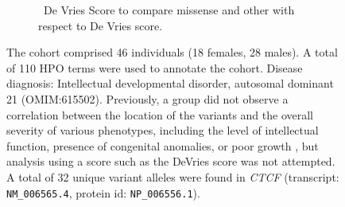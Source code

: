 \begin{figure}[htbp]
\vspace{2em}

\begin{subfigure}[b]{0.95\textwidth}
\captionsetup{justification=raggedright,singlelinecheck=false}
\caption{ De Vries Score to compare missense and other with respect to De Vries score. }
\end{subfigure}

\vspace{2em}

\caption{The cohort comprised 46 individuals (18 females, 28 males). A total of 110 HPO terms were used to annotate the cohort. 
Disease diagnosis: Intellectual developmental disorder, autosomal dominant 21 (OMIM:615502). Previously, a group
did not observe a correlation between the location of the variants and the overall severity of various phenotypes, 
including the level of intellectual function, presence of congenital anomalies, or poor growth \cite{PMID_36454652},
but analysis using a score such as the DeVries score was not attempted.
A total of 32 unique variant alleles were found in \textit{CTCF} (transcript: \texttt{NM\_006565.4}, protein id: \texttt{NP\_006556.1}).}
\end{figure}
